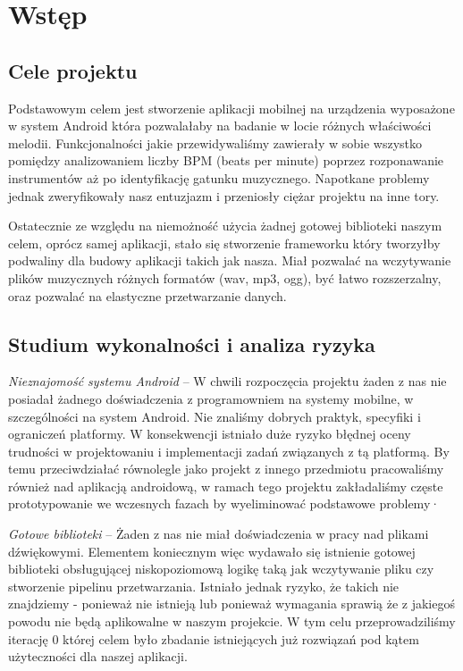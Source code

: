 
\newcommand{\Header}[1]
{\vspace*{4pt}\noindent\textbf{#1}\vspace*{2pt}\par}

\chapter{Wstęp}
\section{Cele projektu}
Podstawowym celem jest stworzenie aplikacji mobilnej na urządzenia wyposażone w system Android która
pozwalałaby na badanie w locie różnych właściwości melodii. Funkcjonalności jakie przewidywaliśmy zawierały w sobie wszystko pomiędzy analizowaniem liczby BPM (beats per minute) poprzez rozponawanie instrumentów aż po identyfikację gatunku muzycznego. Napotkane problemy jednak zweryfikowały nasz entuzjazm i przeniosły ciężar projektu na inne tory.

Ostatecznie ze względu na niemożność użycia żadnej gotowej biblioteki naszym celem, oprócz samej aplikacji, stało się stworzenie frameworku który tworzyłby podwaliny dla budowy aplikacji takich jak nasza. Miał pozwalać na wczytywanie plików muzycznych różnych formatów (wav, mp3, ogg), być łatwo rozszerzalny, oraz pozwalać na elastyczne przetwarzanie danych.
   
\section{Studium wykonalności i analiza ryzyka}

\noindent\emph{Nieznajomość systemu Android} -- W chwili rozpoczęcia projektu żaden z nas nie posiadał żadnego doświadczenia z programowniem na systemy mobilne, w szczególności na system Android. Nie znaliśmy dobrych praktyk, specyfiki i ograniczeń platformy. W konsekwencji istniało duże ryzyko błędnej oceny trudności w projektowaniu i implementacji zadań związanych z tą platformą. By temu przeciwdziałać równolegle jako projekt z innego przedmiotu pracowaliśmy również nad aplikacją androidową, w ramach tego projektu zakładaliśmy częste prototypowanie we wczesnych fazach by wyeliminować podstawowe problemy·

\noindent\emph{Gotowe biblioteki} -- Żaden z nas nie miał doświadczenia w pracy nad plikami dźwiękowymi. Elementem koniecznym więc wydawało się istnienie gotowej biblioteki obsługującej niskopoziomową logikę taką jak wczytywanie pliku czy stworzenie pipelinu przetwarzania. Istniało jednak ryzyko, że takich nie znajdziemy - ponieważ nie istnieją lub ponieważ wymagania sprawią że z jakiegoś powodu nie będą aplikowalne w naszym projekcie. W tym celu przeprowadziliśmy iterację 0 której celem było zbadanie istniejących już rozwiązań pod kątem użyteczności dla naszej aplikacji.

